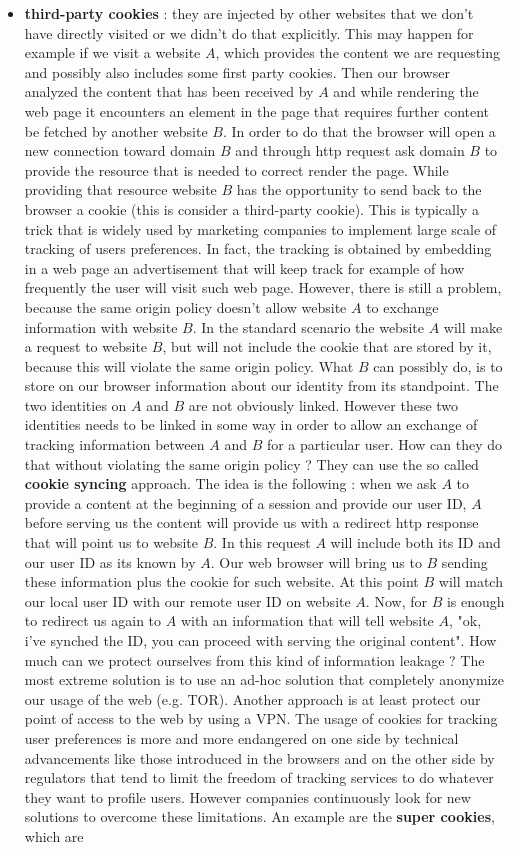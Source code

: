 \begin{itemize}
\item \textbf{third-party cookies} : they are injected by other websites that we don't have directly visited or we didn't do that explicitly. This may happen for example if we visit a website $A$, which provides the content we are requesting and possibly also includes some first party cookies. Then our browser analyzed the content that has been received by $A$ and while rendering the web page it encounters an element in the page that requires further content be fetched by another website $B$. In order to do that the browser will open a new connection toward domain $B$ and through http request ask domain $B$ to provide the resource that is needed to correct render the page. While providing that resource website $B$ has the opportunity to send back to the browser a cookie (this is consider a third-party cookie). This is typically a trick that is widely used by marketing companies to implement large scale of tracking of users preferences. In fact, the tracking is obtained by embedding in a web page an advertisement that will keep track for example of how frequently the user will visit such web page. However, there is still a problem, because the same origin policy doesn't allow website $A$ to exchange information with website $B$. In the standard scenario the website $A$ will make a request to website $B$, but will not include the cookie that are stored by it, because this will violate the same origin policy. What $B$ can possibly do, is to store on our browser information about our identity from its standpoint. The two identities on $A$ and $B$ are not obviously linked. However these two identities needs to be linked in some way in order to allow an exchange of tracking information between $A$ and $B$ for a particular user. How can they do that without violating the same origin policy ? They can use the so called \textbf{cookie syncing} approach. The idea is the following : when we ask $A$ to provide a content at the beginning of a session and provide our user ID, $A$ before serving us the content will provide us with a redirect http response that will point us to website $B$. In this request $A$ will include both its ID and our user ID as its known by $A$. Our web browser will bring us to $B$ sending these information plus the cookie for such website. At this point $B$ will match our local user ID with our remote user ID on website $A$. Now, for $B$ is enough to redirect us again to $A$ with an information that will tell website $A$, "ok, i've synched the ID, you can proceed with serving the original content". How much can we protect ourselves from this kind of information leakage ? The most extreme solution is to use an ad-hoc solution that completely anonymize our usage of the web (e.g. TOR). Another approach is at least protect our point of access to the web by using a VPN. The usage of cookies for tracking user preferences is more and more endangered on one side by technical advancements like those introduced in the browsers and on the other side by regulators that tend to limit the freedom of tracking services to do whatever they want to profile users. However companies continuously look for new solutions to overcome these limitations. An example are the \textbf{super cookies}, which are 
\end{itemize}
